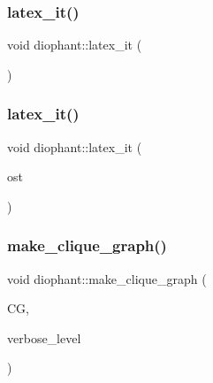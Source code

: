 \mbox{\label{classdiophant_a91317fb6e6784f6a28d831f9935b8a4b}} 
\subsubsection{\texorpdfstring{latex\+\_\+it()}{latex\_it()}\hspace{0.1cm}{\footnotesize\ttfamily [1/2]}}
{\footnotesize\ttfamily void diophant\+::latex\+\_\+it (\begin{DoxyParamCaption}{ }\end{DoxyParamCaption})}

\mbox{\label{classdiophant_ae65e4019fc13a94f210382142e037cc6}} 
\subsubsection{\texorpdfstring{latex\+\_\+it()}{latex\_it()}\hspace{0.1cm}{\footnotesize\ttfamily [2/2]}}
{\footnotesize\ttfamily void diophant\+::latex\+\_\+it (\begin{DoxyParamCaption}\item[{ostream \&}]{ost }\end{DoxyParamCaption})}

\mbox{\label{classdiophant_a09b75f31505294ebafb566e07bd23cdd}} 
\subsubsection{\texorpdfstring{make\+\_\+clique\+\_\+graph()}{make\_clique\_graph()}}
{\footnotesize\ttfamily void diophant\+::make\+\_\+clique\+\_\+graph (\begin{DoxyParamCaption}\item[{\mbox{\hyperlink{classcolored__graph}{colored\+\_\+graph}} $\ast$\&}]{CG,  }\item[{\mbox{\hyperlink{galois_8h_a09fddde158a3a20bd2dcadb609de11dc}{I\+NT}}}]{verbose\+\_\+level }\end{DoxyParamCaption})}

